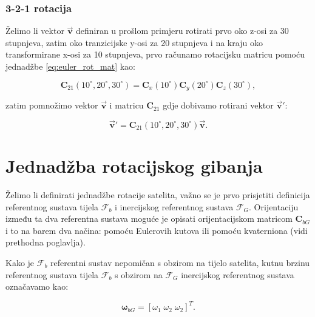 \documentclass[times, utf8, diplomski, numeric]{templates/template}
\begin{document}
{{{            \subsubsection{3-2-1 rotacija}{
                Želimo li vektor $\overrightarrow{\boldsymbol{v}}$ definiran u prošlom primjeru rotirati prvo oko z-osi za 30 stupnjeva, zatim oko tranzicijske y-osi za 20 stupnjeva i na kraju oko transformirane x-osi za 10 stupnjeva, prvo računamo rotacijsku matricu pomoću jednadžbe \ref{eq:euler_rot_mat} kao:

                \begin{equation}
                \boldsymbol{C}_{21}(10^\circ, 20^\circ, 30^\circ) = \boldsymbol{C}_{x}(10^\circ) \boldsymbol{C}_{y}(20^\circ) \boldsymbol{C}_{z}(30^\circ),
                \end{equation}

                zatim pomnožimo vektor $\overrightarrow{\boldsymbol{v}}$ i matricu $\boldsymbol{C}_{21}$ gdje dobivamo rotirani vektor $\overrightarrow{\boldsymbol{v}}'$:

                \begin{equation}
                    \overrightarrow{\boldsymbol{v}}' = \boldsymbol{C}_{21}(10^\circ, 20^\circ, 30^\circ) \overrightarrow{\boldsymbol{v}}.
                \end{equation}
            }
        }
    }

    \section{Jednadžba rotacijskog gibanja}{
        Želimo li definirati jednadžbe rotacije satelita, važno se je prvo prisjetiti definicija referentnog sustava tijela $\mathcal{F}_b$ i inercijskog referentnog sustava $\mathcal{F}_G$. Orijentaciju između ta dva referentna sustava moguće je opisati orijentacijskom matricom $\boldsymbol{C}_{bG}$ i to na barem dva načina: pomoću Eulerovih kutova ili pomoću kvaterniona (vidi prethodna poglavlja).

        Kako je $\mathcal{F}_b$ referentni sustav nepomičan s obzirom na tijelo satelita, kutnu brzinu referentnog sustava tijela $\mathcal{F}_b$ s obzirom na $\mathcal{F}_G$ inercijskog referentnog sustava označavamo kao:

        \begin{equation}
            \boldsymbol{\omega}_{bG} = \left[ \omega_1 \; \omega_2 \; \omega_2\right]^T.
        \end{equation}

}}
\end{document}
